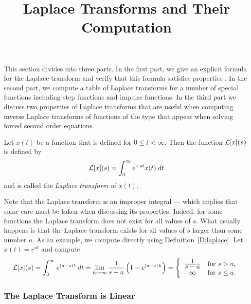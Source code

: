 \documentclass{ximera}
\title{Laplace Transforms and Their Computation}
\begin{document}
\begin{abstract}
\end{abstract}
\maketitle

 \label{S:13.3}

This section divides into three parts.  In the first part, we give an explicit 
formula for the Laplace transform and verify that this formula satisfies 
properties .  In the second part, we compute a table of Laplace
transforms for a number of special functions including step functions and
impulse functions.  In the third part we discuss two properties of Laplace
transforms that are useful when computing inverse Laplace transforms of
functions of the type that appear when solving forced second order equations.

\begin{Def}  \label{D:laplace}
Let $x(t)$ be a function that is defined for $0\le t < \infty$.
Then the function ${\cal L}[x](s)$ is defined by
\begin{equation} \label{E:laplace}
{\cal L}[x](s) = \int_0^{\infty} e^{-st} x(t)\; dt
\end{equation}
and is called the {\em Laplace transform\/} of $x(t)$.
\end{Def}

Note that the Laplace transform is an improper 
integral --- which implies that some care must be taken when discussing 
its properties.  Indeed, for some functions the Laplace transform does 
not exist for all values of $s$.  What usually happens is that 
the Laplace transform exists for all values of $s$ larger than some 
number $a$.  As an example, we compute  directly using 
Definition~\ref{D:laplace}.  Let $x(t)=e^{at}$ and compute 
\begin{equation}  \label{e:expat}
{\cal L}[x](s) = \int_0^{\infty} e^{(a-s)t}\; dt=
\lim\limits_{h\to \infty} \frac{1}{s-a}\left( 1-e^{(a-s)h} \right)
=\left\{ \begin{array}{cl} \frac{\displaystyle 1}{\displaystyle s-a} & \mbox{for $s>a$,}\\
\infty & \mbox{for $s\le a$.}\end{array}\right.
\end{equation}

\subsubsection*{The Laplace Transform is Linear}
\end{document}
